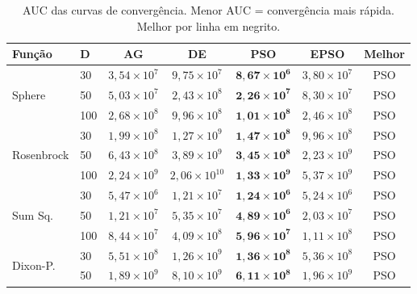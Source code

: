 \documentclass[runningheads]{llncs}
\begin{document}
\begin{table}[H]
\caption{AUC das curvas de convergência. Menor AUC = convergência
mais rápida. Melhor por linha em negrito.}
\label{tab:auc}
\centering
\scriptsize
\setlength{\tabcolsep}{3pt}
\begin{tabular}{llccccc}
\toprule
\textbf{Função} & \textbf{D} &
\textbf{AG} & \textbf{DE} & \textbf{PSO} & \textbf{EPSO} & \textbf{Melhor} \\
\midrule
\multirow{3}{*}{Sphere}
  & 30  & $3{,}54{\times}10^{7}$ & $9{,}75{\times}10^{7}$ & \cellcolor{green!20}$\mathbf{8{,}67{\times}10^{6}}$ & $3{,}80{\times}10^{7}$ & PSO \\
  & 50  & $5{,}03{\times}10^{7}$ & $2{,}43{\times}10^{8}$ & \cellcolor{green!20}$\mathbf{2{,}26{\times}10^{7}}$ & $8{,}30{\times}10^{7}$ & PSO \\
  & 100 & $2{,}68{\times}10^{8}$ & $9{,}96{\times}10^{8}$ & \cellcolor{green!20}$\mathbf{1{,}01{\times}10^{8}}$ & $2{,}46{\times}10^{8}$ & PSO \\
\midrule
\multirow{3}{*}{Rosenbrock}
  & 30  & $1{,}99{\times}10^{8}$ & $1{,}27{\times}10^{9}$ & \cellcolor{green!20}$\mathbf{1{,}47{\times}10^{8}}$ & $9{,}96{\times}10^{8}$ & PSO \\
  & 50  & $6{,}43{\times}10^{8}$ & $3{,}89{\times}10^{9}$ & \cellcolor{green!20}$\mathbf{3{,}45{\times}10^{8}}$ & $2{,}23{\times}10^{9}$ & PSO \\
  & 100 & $2{,}24{\times}10^{9}$ & $2{,}06{\times}10^{10}$ & \cellcolor{green!20}$\mathbf{1{,}33{\times}10^{9}}$ & $5{,}37{\times}10^{9}$ & PSO \\
\midrule
\multirow{3}{*}{Sum Sq.}
  & 30  & $5{,}47{\times}10^{6}$ & $1{,}21{\times}10^{7}$ & \cellcolor{green!20}$\mathbf{1{,}24{\times}10^{6}}$ & $5{,}24{\times}10^{6}$ & PSO \\
  & 50  & $1{,}21{\times}10^{7}$ & $5{,}35{\times}10^{7}$ & \cellcolor{green!20}$\mathbf{4{,}89{\times}10^{6}}$ & $2{,}03{\times}10^{7}$ & PSO \\
  & 100 & $8{,}44{\times}10^{7}$ & $4{,}09{\times}10^{8}$ & \cellcolor{green!20}$\mathbf{5{,}96{\times}10^{7}}$ & $1{,}11{\times}10^{8}$ & PSO \\
\midrule
\multirow{3}{*}{Dixon-P.}
  & 30  & $5{,}51{\times}10^{8}$ & $1{,}26{\times}10^{9}$ & \cellcolor{green!20}$\mathbf{1{,}36{\times}10^{8}}$ & $5{,}36{\times}10^{8}$ & PSO \\
  & 50  & $1{,}89{\times}10^{9}$ & $8{,}10{\times}10^{9}$ & \cellcolor{green!20}$\mathbf{6{,}11{\times}10^{8}}$ & $1{,}96{\times}10^{9}$ & PSO \\

\end{tabular}
\end{table}
\end{document}
